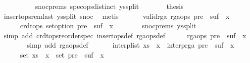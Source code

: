 \begin{isabellebody}
\ \ \ \ \ \ \ \ \ \ snoc{\isachardot}prems\ spec{\isacharunderscore}ops{\isacharunderscore}distinct\ ys{\isacharunderscore}split{\isacharparenright}\isanewline
\ \ \ \ \isamarkupfalse%
\ \isamarkupfalse%
\ {\isacharquery}thesis\isanewline
\ \ \ \ \ \ \isamarkupfalse%
\ insert{\isacharunderscore}ops{\isacharunderscore}rem{\isacharunderscore}last\ ys{\isacharunderscore}split\ snoc\ \isamarkupfalse%
\ metis\isanewline
\ \ \isamarkupfalse%
\isanewline
\ \ \isamarkupfalse%
\ valid{\isacharunderscore}rga{\isacharcolon}\ {\isachardoublequoteopen}rga{\isacharunderscore}ops\ {\isacharparenleft}pre\ {\isacharat}\ suf\ {\isacharat}\ {\isacharbrackleft}x{\isacharbrackright}{\isacharparenright}{\isachardoublequoteclose}\isanewline
\ \ \isamarkupfalse%
\ {\isacharminus}\isanewline
\ \ \ \ \isamarkupfalse%
\ {\isachardoublequoteopen}crdt{\isacharunderscore}ops\ set{\isacharunderscore}option\ {\isacharparenleft}pre\ {\isacharat}\ suf\ {\isacharat}\ {\isacharbrackleft}x{\isacharbrackright}{\isacharparenright}{\isachardoublequoteclose}\isanewline
\ \ \ \ \ \ \isamarkupfalse%
\ snoc{\isachardot}prems\ ys{\isacharunderscore}split\isanewline
\ \ \ \ \ \ \isamarkupfalse%
\ {\isacharparenleft}simp\ add{\isacharcolon}\ crdt{\isacharunderscore}ops{\isacharunderscore}reorder{\isacharunderscore}spec\ insert{\isacharunderscore}ops{\isacharunderscore}def\ rga{\isacharunderscore}ops{\isacharunderscore}def{\isacharparenright}\isanewline
\ \ \ \ \isamarkupfalse%
\ {\isachardoublequoteopen}rga{\isacharunderscore}ops\ {\isacharparenleft}pre\ {\isacharat}\ suf\ {\isacharat}\ {\isacharbrackleft}x{\isacharbrackright}{\isacharparenright}{\isachardoublequoteclose}\isanewline
\ \ \ \ \ \ \isamarkupfalse%
\ {\isacharparenleft}simp\ add{\isacharcolon}\ rga{\isacharunderscore}ops{\isacharunderscore}def{\isacharparenright}\isanewline
\ \ \isamarkupfalse%
\isanewline
\ \ \isamarkupfalse%
\ {\isachardoublequoteopen}interp{\isacharunderscore}list\ {\isacharparenleft}xs\ {\isacharat}\ {\isacharbrackleft}x{\isacharbrackright}{\isacharparenright}\ {\isacharequal}\ interp{\isacharunderscore}rga\ {\isacharparenleft}pre\ {\isacharat}\ suf\ {\isacharat}\ {\isacharbrackleft}x{\isacharbrackright}{\isacharparenright}{\isachardoublequoteclose}\isanewline
\ \ \isamarkupfalse%
\ {\isacharminus}\isanewline
\ \ \ \ \isamarkupfalse%
\ {\isachardoublequoteopen}set\ {\isacharparenleft}xs\ {\isacharat}\ {\isacharbrackleft}x{\isacharbrackright}{\isacharparenright}\ {\isacharequal}\ set\ {\isacharparenleft}pre\ {\isacharat}\ suf\ {\isacharat}\ {\isacharbrackleft}x{\isacharbrackright}{\isacharparenright}{\isachardoublequoteclose}\isanewline

\end{isabellebody}
